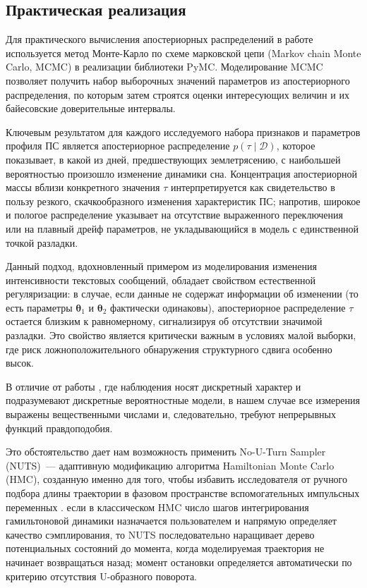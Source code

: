 \documentclass[14pt]{mmcs_article}
\begin{document}
\subsection*{Практическая реализация}

Для практического вычисления апостериорных распределений в работе используется метод Монте-Карло по схеме марковской цепи (Markov chain Monte Carlo, MCMC) в реализации библиотеки PyMC. Моделирование MCMC позволяет получить набор выборочных значений параметров из апостериорного распределения, по которым затем строятся оценки интересующих величин и их байесовские доверительные интервалы. 

Ключевым результатом для каждого исследуемого набора признаков и параметров профиля ПС является апостериорное распределение $p(\tau \mid \mathcal{D})$, которое показывает, в какой из дней, предшествующих землетрясению, с наибольшей вероятностью произошло изменение динамики сна. Концентрация апостериорной массы вблизи конкретного значения $\tau$ интерпретируется как свидетельство в пользу резкого, скачкообразного изменения характеристик ПС; напротив, широкое и пологое распределение указывает на отсутствие выраженного переключения или на плавный дрейф параметров, не укладывающийся в модель с единственной точкой разладки.

Данный подход,  вдохновленный примером из \cite{DavidPil2015} моделирования изменения интенсивности текстовых сообщений, обладает свойством естественной регуляризации: в случае, если данные не содержат информации об изменении (то есть параметры $\boldsymbol{\theta}_1$ и $\boldsymbol{\theta}_2$ фактически одинаковы), апостериорное распределение $\tau$ остается близким к равномерному, сигнализируя об отсутствии значимой разладки. Это свойство является критически важным в условиях малой выборки, где риск ложноположительного обнаружения структурного сдвига особенно высок.

В отличие от работы \cite{DavidPil2015}, где наблюдения
носят дискретный характер и подразумевают дискретные
вероятностные модели, в нашем случае все измерения выражены
вещественными числами и, следовательно, требуют непрерывных
функций правдоподобия.

Это обстоятельство дает нам возможность применить
No-U-Turn Sampler (NUTS)~--- адаптивную модификацию
алгоритма Hamiltonian Monte Carlo (HMC), созданную именно
для того, чтобы избавить исследователя от ручного подбора
длины траектории в фазовом пространстве вспомогательных
импульсных переменных \cite{HoffmanGelman2014}. если в
классическом HMC число шагов интегрирования гамильтоновой
динамики назначается пользователем и напрямую определяет
качество сэмплирования, то NUTS последовательно наращивает
дерево потенциальных состояний до момента, когда
моделируемая траектория не начинает возвращаться назад;
момент остановки определяется автоматически по критерию
отсутствия U-образного поворота.
\end{document}
